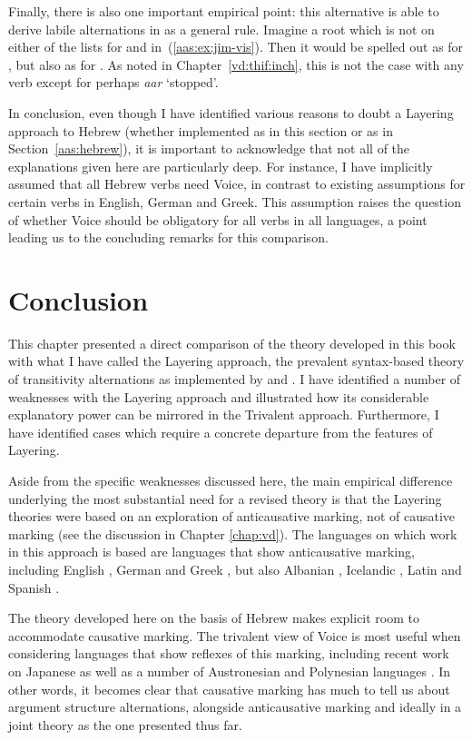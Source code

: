 Finally, there is also one important empirical point: this alternative is able to derive labile alternations in {\tkal} as a general rule. Imagine a root  which is not on either of the lists for {\vds} and {\vzs} in~(\ref{aas:ex:jim-vis}). Then it would be spelled out as {\tkal} for {\vds}, but also as {\tkal} for {\vzs}. As noted in Chapter~\ref{vd:thif:inch}, this is not the case with any verb except for perhaps \emph{a{\ts}ar} `stopped'.

In conclusion, even though I have identified various reasons to doubt a Layering approach to Hebrew (whether implemented as in this section or as in Section~\ref{aas:hebrew}), it is important to acknowledge that not all of the explanations given here are particularly deep. For instance, I have implicitly assumed that all Hebrew verbs need Voice, in contrast to existing assumptions for certain verbs in English, German and Greek. This assumption raises the question of whether Voice should be obligatory for all verbs in all languages, a point leading us to the concluding remarks for this comparison.


\section{Conclusion} \label{aas:conc}
This chapter presented a direct comparison of the theory developed in this book with what I have called the Layering approach, the prevalent syntax-based theory of transitivity alternations as implemented by \cite{schaefer08,schaefer17oup} and \cite{layering15}. I have identified a number of weaknesses with the Layering approach and illustrated how its considerable explanatory power can be mirrored in the Trivalent approach. Furthermore, I have identified cases which require a concrete departure from the features of Layering.

Aside from the specific weaknesses discussed here, the main empirical difference underlying the most substantial need for a revised theory is that the Layering theories were based on an exploration of anticausative marking, not of causative marking (see the discussion in Chapter \ref{chap:vd}). The languages on which work in this approach is based are languages that show anticausative marking, including English \citep{myler16mit}, German \citep{schaefer17oup} and Greek \citep{spathasetal15}, but also Albanian \citep{kallulli13}, Icelandic \citep{wood15springer}, Latin \citep{embick04,kastnerzu17} and Spanish \citep{schaefervivanco16}.

The theory developed here on the basis of Hebrew makes explicit room to accommodate causative marking. The trivalent view of Voice is most useful when considering languages that show reflexes of this marking, including recent work on Japanese \citep{oseki17nyu} as well as a number of Austronesian and Polynesian languages \citep{nie17}. In other words, it becomes clear that causative marking has much to tell us about argument structure alternations, alongside anticausative marking and ideally in a joint theory as the one presented thus far.

